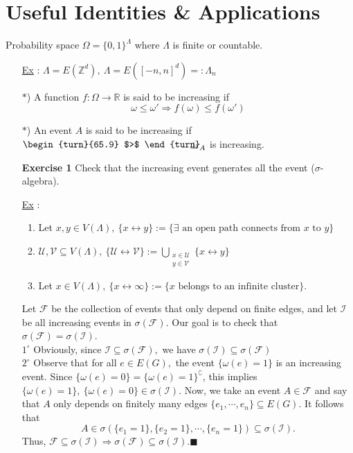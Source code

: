 \documentclass[12pt,a4paper]{report}
\theoremstyle{definition}
\newcommand{\SOL}{\fbox{ \tt s\parbox[b][2pt][c]{6pt}{o}\hspace*{-7pt} L:}}
\newcommand{\indecate}{\mbox{\begin{turn}{65.9}
$>$
\end{turn}\hspace{-10.5pt}\parbox[t][-5pt][c]{10pt}{$\bot$}\hspace{-4.35pt}\parbox[t][-3.4pt][c]{4pt}{$\shortmid$}}}
\begin{document}
\chapter{Useful Identities \& Applications}
\begin{flushleft}
Probability space $\Omega=\{0,1\}^{\Lambda}$ where $\Lambda$ is finite or countable.
\end{flushleft}
\begin{enumerate}
    \item[\underline{Ex} :] $\Lambda=E(\mathbb{Z}^d),\ \Lambda=E([-n,n]^d)=:\Lambda_n$ 
    \begin{center}
    \end{center}
    \item[$*$)] A function $f:\Omega\to\mathbb{R}$ is said to be increasing if 
    \[
    \omega\leq \omega'\Rightarrow f(\omega)\leq f(\omega')
    \]
    \item[$*$)] An event $A$ is said to be increasing if $\indecate_A$ is increasing.
    \item[\textbf{Exercise 1}] Check that the increasing event generates all the event ($\sigma$-algebra).
    \item[\underline{Ex} :] \begin{enumerate}
        \item Let $x,y\in V(\Lambda),\ \{x\leftrightarrow y\}:=\{\exists\mbox{ an open path connects from } x \mbox{ to }y\}$
        \item $\mathcal{U},\mathcal{V}\subseteq V(\Lambda),\ \{\mathcal{U}\leftrightarrow\mathcal{V}\}:=\bigcup\limits_{\substack{x\in \mathcal{U}\\ y\in \mathcal{V}}}\{x\leftrightarrow y\}$
        \item Let $x\in V(\Lambda),\ \{x\leftrightarrow\infty\}:=\{x\mbox{ belongs to an infinite cluster}\}.$
    \end{enumerate}
    \item[\SOL] Let $\mathcal{F}$ be the collection of events that only depend on finite edges, and let $\mathcal{I}$ be all increasing events in $\sigma(\mathcal{F}).$ Our goal is to check that $\sigma(\mathcal{F})=\sigma(\mathcal{I}).$\\[5pt]
    $1^\circ$ Obviously, since $\mathcal{I}\subseteq \sigma(\mathcal{F}),$ we have $\sigma(\mathcal{I})\subseteq \sigma(\mathcal{F})$\\[5pt]
    $2^\circ$ Observe that for all $e\in E(G),$ the event $\{\omega(e)=1\}$ is an increasing event. Since $\{\omega(e)=0\}=\{\omega(e)=1\}^\complement$, this implies $\{\omega(e)=1\},\ \{\omega(e)=0\}\in \sigma(\mathcal{I}).$ Now, we take an event $A\in \mathcal{F}$ and say  that $A$ only depends on finitely many edges $\{e_1,\cdots ,e_n\}\subseteq E(G)$. It follows that  
    \[
    A\in\sigma(\{e_1=1\},\{e_2=1\},\cdots ,\{e_n=1\})\subseteq \sigma(\mathcal{I}).
    \]
    Thus, $\mathcal{F}\subseteq \sigma(\mathcal{I})\Rightarrow\sigma(\mathcal{F})\subseteq \sigma(\mathcal{I}).$\quad $\blacksquare$
\end{enumerate}
\newpage
\end{document}
